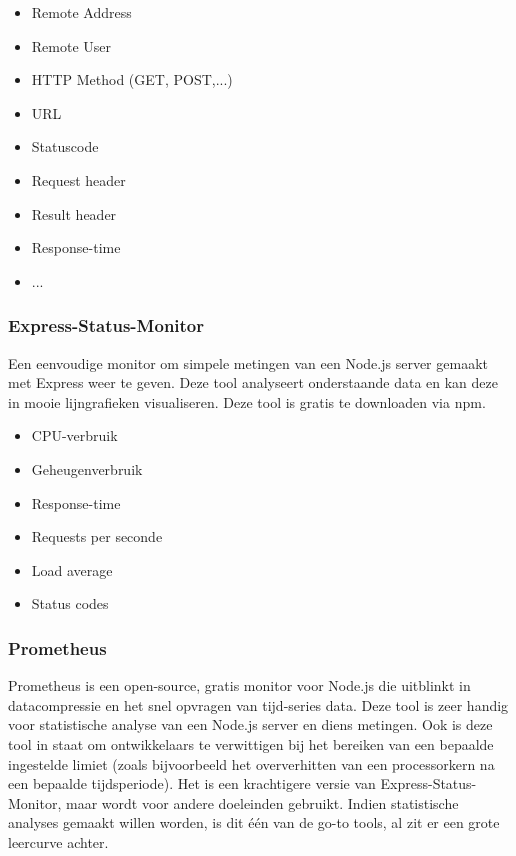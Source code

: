 \begin{itemize}
	\item Remote Address
	\item Remote User
	\item HTTP Method (GET, POST,...)
	\item URL
	\item Statuscode
	\item Request header
	\item Result header
	\item Response-time
	\item ...
\end{itemize}

\subsubsection{Express-Status-Monitor}
\label{sec:statusMonitor}

Een eenvoudige monitor om simpele metingen van een Node.js server gemaakt met Express weer te geven. Deze tool analyseert onderstaande data en kan deze in mooie lijngrafieken visualiseren. Deze tool is gratis te downloaden via npm.

\begin{itemize}
	\item CPU-verbruik
	\item Geheugenverbruik
	\item Response-time
	\item Requests per seconde
	\item Load average
	\item Status codes
\end{itemize}

\subsubsection{Prometheus}
\label{sec:prometheus}

Prometheus is een open-source, gratis monitor voor Node.js die uitblinkt in datacompressie en het snel opvragen van tijd-series data. Deze tool is zeer handig voor statistische analyse van een Node.js server en diens metingen. Ook is deze tool in staat om ontwikkelaars te verwittigen bij het bereiken van een bepaalde ingestelde limiet (zoals bijvoorbeeld het oververhitten van een processorkern na een bepaalde tijdsperiode). Het is een krachtigere versie van Express-Status-Monitor, maar wordt voor andere doeleinden gebruikt. Indien statistische analyses gemaakt willen worden, is dit één van de go-to tools, al zit er een grote leercurve achter.

